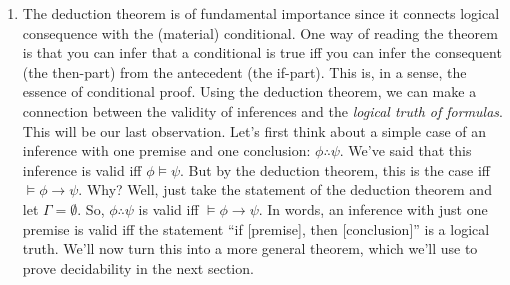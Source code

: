 \begin{enumerate}[\thesection.1]
\begin{proof}
\begin{itemize}
			\item Suppose conversely that $\Gamma\vDash\phi\to\psi$. That is for each valuation $v$, if $\llbracket\theta\rrbracket_v=1$ for all $\theta\in\Gamma$, then $\llbracket\phi\to\psi\rrbracket_v=1$. We want to show that $\Gamma\cup\{\phi\}\vDash\psi$. That is, we need to show that for all valuations $v$ such that $\llbracket\theta\rrbracket_v=1$, for all $\theta\in \Gamma\cup\{\phi\},$ we have $\llbracket\psi\rrbracket_v=1$. So let $v$ be an arbitrary valuation $v$ such that $\llbracket\theta\rrbracket_v=1$, for all $\theta\in \Gamma\cup\{\phi\}$. First, note that this means that $\llbracket\theta\rrbracket_v=1$, for all $\theta\in \Gamma$, and so, since $\Gamma\vDash\varphi\to\psi$, we get that $\llbracket\phi\to\psi\rrbracket_v=1$. Second, note that we also get that $\llbracket\phi\rrbracket_v=1$---simply since $\phi\in\Gamma\cup\{\phi\}$. Now consider $\llbracket\phi\to\psi\rrbracket_v=max(1-\llbracket\phi\rrbracket_v,\llbracket\psi\rrbracket_v)$. Since $\llbracket\phi\to\psi\rrbracket_v=1$, we get that $max(1-\llbracket\phi\rrbracket_v,\llbracket\psi\rrbracket_v)=1$. And since $\llbracket\phi\rrbracket_v=1$, we get that $max(1-1,\llbracket\psi\rrbracket_v)=max(0,\llbracket\psi\rrbracket_v)=1$. But for $x\in\{0,1\}$, we can only have $max(0,x)=1$, if $x=1$. So $\llbracket\psi\rrbracket_v=1$, as desired. So, we have that if $\Gamma\vDash\phi\to\psi$, then $\Gamma\cup\{\phi\}\vDash\psi$.
			
			\end{itemize}
			This completes the proof of the deduction theorem.
			\end{proof}
			
		\item The deduction theorem is of fundamental importance since it connects logical consequence with the (material) conditional. One way of reading the theorem is that you can infer that a conditional is true iff you can infer the consequent (the then-part) from the antecedent (the if-part). This is, in a sense, the essence of conditional proof. Using the deduction theorem, we can make a connection between the validity of inferences and the \emph{logical truth of formulas}. This will be our last observation. Let's first think about a simple case of an inference with one premise and one conclusion: $\phi\therefore\psi$. We've said that this inference is valid iff $\phi\vDash\psi$. But by the deduction theorem, this is the case iff $\vDash\phi\to\psi$. Why? Well, just take the statement of the deduction theorem and let $\Gamma=\emptyset$. So, $\phi\therefore\psi$ is valid iff $\vDash\phi\to\psi$. In words, an inference with just one premise is valid iff the statement ``if [premise], then [conclusion]'' is a logical truth. We'll now turn this into a more general theorem, which we'll use to prove decidability in the next section.
		

\end{enumerate}
